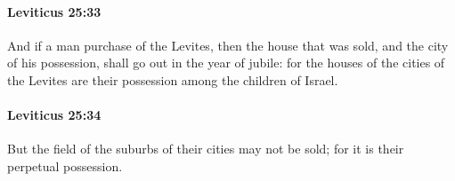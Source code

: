 		\paragraph{Leviticus 25:33} %
			\label{LEVITICUS-25-33}

			And if a man purchase of the Levites, then the house that was sold, and the city of his possession, shall go out in the year of jubile: for the houses of the cities of the Levites are their possession among the children of Israel.


		\paragraph{Leviticus 25:34} %
			\label{LEVITICUS-25-34}

			But the field of the suburbs of their cities may not be sold; for it is their perpetual possession.


